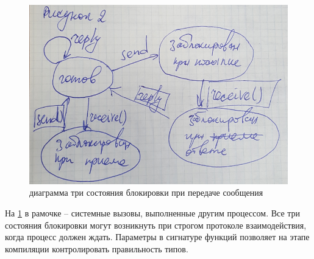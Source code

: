 \begin{figure}[H]
    \centering
    \includegraphics[width=\textwidth]{pic/2.png}
    \caption{ диаграмма три состояния блокировки при передаче сообщения}
    \label{pic:diag_3_state}
\end{figure}

На \ref{pic:diag_3_state} в рамочке – системные вызовы, выполненные другим процессом. Все три состояния блокировки могут возникнуть при строгом протоколе взаимодействия, когда процесс должен ждать.
Параметры в сигнатуре функций позволяет на этапе компиляции контролировать правильность типов.